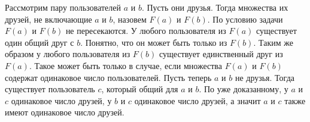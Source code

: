 \documentclass{article}
\begin{document}
Рассмотрим пару пользователей $a$ и $b$. Пусть они друзья. Тогда множества их друзей, не включающие $a$ и $b$, назовем $F(a)$ и $F(b)$. По условию задачи $F(a)$ и $F(b)$ не пересекаются. У любого пользователя 
из $F(a)$ существует один общий друг с $b$. Понятно, что он может быть только из $F(b)$. Таким же образом у любого пользователя из $F(b)$ существует единственный друг из $F(a)$. 
Такое может быть только в случае, если множества $F(a)$ и $F(b)$ содержат одинаковое число пользователей. Пусть теперь $a$ и $b$ не друзья. Тогда существует пользователь $c$, который 
общий для $a$ и $b$. По уже доказанному, у $a$ и $c$ одинаковое число друзей, у $b$ и $c$ одинаковое число друзей, а значит $a$ и $c$ также имеют одинаковое число друзей.
\end{document}
